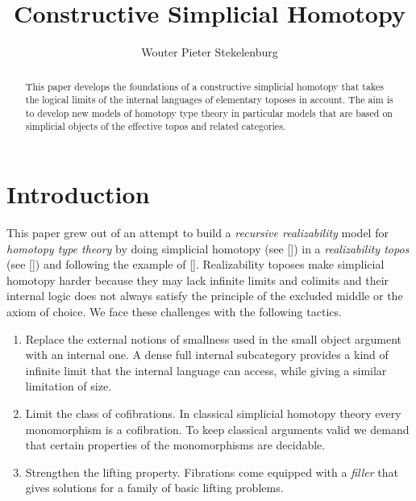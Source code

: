 \documentclass{tac}
\title{Constructive Simplicial Homotopy}
\author{Wouter Pieter Stekelenburg}
\newcommand\hide[1]{}
\newcommand\citep[1]{[\cite{#1}]}
\begin{document}
\begin{abstract} This paper develops the foundations of a constructive 
simplicial homotopy that takes the logical limits of the internal languages of 
elementary toposes in account. The aim is to develop new models of homotopy 
type theory in particular models that are based on simplicial objects of 
the effective topos and related categories.
\end{abstract}

\hide{
Three papers:
-simplicial homotopy
-complete categories [how they are preserved]
-the realizability model of HOTT [how to get a fibrant object out of a category]

Idea: reverse the order. definitions--theorem--lemmas. That way the purpose of 
the lemmas is set up from the start.
}

\maketitle

\section*{Introduction}
This paper grew out of an attempt to build a \emph{recursive realizability} 
model for \emph{homotopy type theory} by doing simplicial homotopy (see 
\citep{Hovey99,GJSHT}) in a \emph{realizability topos} (see \citep{MR2479466}) 
and following the example of \citep{KLV12}.
Realizability toposes make simplicial homotopy harder because they may lack 
infinite limits and colimits and their internal logic does not always satisfy 
the principle of the excluded middle or the axiom of choice. We face these 
challenges with the following tactics.
\begin{enumerate}
\item Replace the external notions of smallness used in the small object 
argument with an internal one. A dense full internal subcategory provides
a kind of infinite limit that the internal language can access, while giving a
similar limitation of size.
\item Limit the class of cofibrations. In classical simplicial homotopy theory 
every mono\-morphism is a cofibration. To keep classical arguments valid we 
demand that certain properties of the monomorphisms are decidable.
\item Strengthen the lifting property. Fibrations come equipped with a 
\emph{filler} that gives solutions for a family of basic lifting problems.
\end{enumerate}
\end{document}
